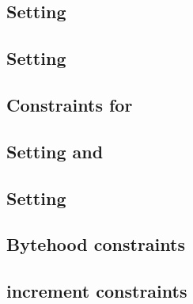 \subsection{Setting \blsIndex{}}                              \label{bls: generalities: setting index}                      
\subsection{Setting           \maxCt{}}                       \label{bls: generalities: setting ct_max}                     
\subsection{Constraints for \ct{}}                            \label{bls: generalities: setting ct}                         
\subsection{Setting \isFirstInput{} and \isSecondInput{}}     \label{bls: generalities: setting is_first and is_second}     
\subsection{Setting \accInputs{}}                             \label{bls: generalities: setting acc pairings}               
\subsection{Bytehood constraints}                             \label{bls: generalities: bytehood and accumulator}           
\subsection{\blsId{} increment constraints}                   \label{bls: generalities: stamp increments}                   
